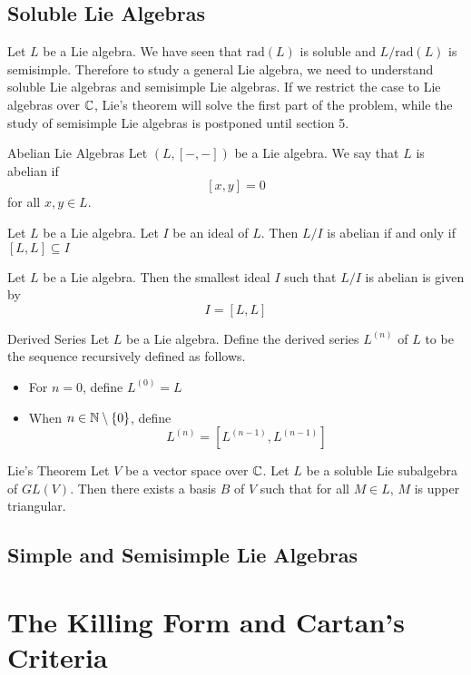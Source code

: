 \documentclass[a4paper]{article}
\begin{document}
\subsection{Soluble Lie Algebras}
Let $L$ be a Lie algebra. We have seen that $\text{rad}(L)$ is soluble and $L/\text{rad}(L)$ is semisimple. Therefore to study a general Lie algebra, we need to understand soluble Lie algebras and semisimple Lie algebras. If we restrict the case to Lie algebras over $\mathbb{C}$, Lie's theorem will solve the first part of the problem, while the study of semisimple Lie algebras is postponed until section 5. 

\begin{defn}{Abelian Lie Algebras}{} Let $(L,[-,-])$ be a Lie algebra. We say that $L$ is abelian if $$[x,y]=0$$ for all $x,y\in L$. 
\end{defn}

\begin{lmm}{}{} Let $L$ be a Lie algebra. Let $I$ be an ideal of $L$. Then $L/I$ is abelian if and only if $[L,L]\subseteq I$
\end{lmm}

\begin{crl}{}{} Let $L$ be a Lie algebra. Then the smallest ideal $I$ such that $L/I$ is abelian is given by $$I=[L,L]$$
\end{crl}

\begin{defn}{Derived Series}{} Let $L$ be a Lie algebra. Define the derived series $L^{(n)}$ of $L$ to be the sequence recursively defined as follows. 
\begin{itemize}
\item For $n=0$, define $L^{(0)}=L$
\item When $n\in\mathbb{N}\setminus\{0\}$, define $$L^{(n)}=[L^{(n-1)},L^{(n-1)}]$$
\end{itemize}
\end{defn}

\begin{thm}{Lie's Theorem}{} Let $V$ be a vector space over $\mathbb{C}$. Let $L$ be a soluble Lie subalgebra of $GL(V)$. Then there exists a basis $B$ of $V$ such that for all $M\in L$, $M$ is upper triangular. 
\end{thm}

\subsection{Simple and Semisimple Lie Algebras}

\pagebreak
\section{The Killing Form and Cartan's Criteria}
\end{document}

